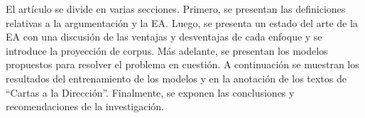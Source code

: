 \documentclass[a4paper,11pt,twocolumn,twoside]{article}
\begin{document}



El artículo se divide en varias secciones. Primero, se presentan las definiciones 
relativas a la argumentación y la EA. Luego, se presenta 
un estado del arte de la EA con una discusión de las
ventajas y desventajas de cada enfoque y se introduce la proyección de corpus. Más adelante, 
se presentan los modelos propuestos para resolver el problema en 
cuestión. A continuación se muestran los resultados del entrenamiento de los modelos y en 
la anotación de los textos de ``Cartas a la Dirección''. Finalmente, se exponen las conclusiones y 
recomendaciones de la investigación.
\end{document}
